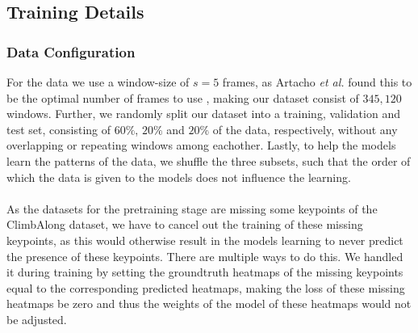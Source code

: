 \documentclass[./main.tex]{subfiles}
\begin{document}
\subsection{Training Details}
\label{subsubsec:training_details}
\subsubsection{Data Configuration} For the data we use a window-size of $s = 5$ frames, as Artacho \textit{et al.} found this to be the optimal number of frames to use \cite{https://doi.org/10.48550/arxiv.2001.08095}, making our dataset consist of $345,120$ windows. Further, we randomly split our dataset into a training, validation and test set, consisting of $60\%$, $20\%$ and $20\%$ of the data, respectively, without any overlapping or repeating windows among eachother. Lastly, to help the models learn the patterns of the data, we shuffle the three subsets, such that the order of which the data is given to the models does not influence the learning.
\\
\\
As the datasets for the pretraining stage are missing some keypoints of the ClimbAlong dataset, we have to cancel out the training of these missing keypoints, as this would otherwise result in the models learning to never predict the presence of these keypoints. There are multiple ways to do this. We handled it during training by setting the groundtruth heatmaps of the missing keypoints equal to the corresponding predicted heatmaps, making the loss of these missing heatmaps be zero and thus the weights of the model of these heatmaps would not be adjusted. 
\end{document}
